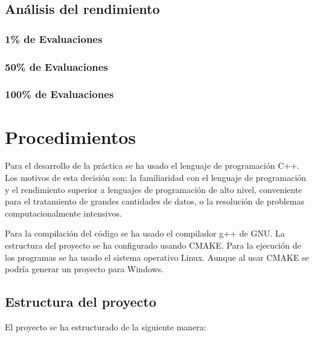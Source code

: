 \documentclass[a4paper, 12.5pt]{report}
\begin{document}
    \subsection{Análisis del rendimiento}

    \subsubsection{1\% de Evaluaciones}

    \subsubsection{50\% de Evaluaciones}

    \subsubsection{100\% de Evaluaciones}


    \section{Procedimientos}

    Para el desarrollo de la práctica se ha usado el lenguaje de programación C++. Los motivos de esta decisión son: la familiaridad con el lenguaje de programación y el rendimiento superior a lenguajes de programación de alto nivel, conveniente para el tratamiento de grandes cantidades de datos, o la resolución de problemas computacionalmente intensivos.

    Para la compilación del código se ha usado el compilador g++ de GNU. La estructura del proyecto se ha configurado usando CMAKE. Para la ejecución de los programas se ha usado el sistema operativo Linux. Aunque al usar CMAKE se podría generar un proyecto para Windows.

    \newpage

    \subsection{Estructura del proyecto}

    El proyecto se ha estructurado de la siguiente manera:
\end{document}
